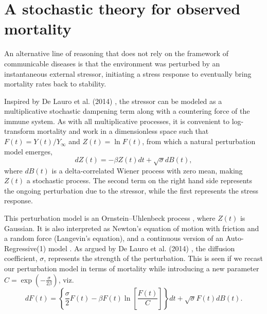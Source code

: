 \documentclass{article}
\begin{document}
\section*{A stochastic theory for observed mortality}
\label{seq:alt}
An alternative line of reasoning that does not rely on the framework of communicable diseases is that the environment was perturbed by an instantaneous external stressor, initiating a stress response to eventually bring mortality rates back to stability.

Inspired by De Lauro et al. (2014) \cite{de2014stochastic}, the stressor can be modeled as a multiplicative stochastic dampening term along with a countering force of the immune system. 
As with all multiplicative processes, it is convenient to log-transform mortality and work in a dimensionless space such that $F(t)=Y(t)/Y_\infty$ and $Z(t)=\ln{F}(t)$, from which a natural perturbation model emerges,
\begin{equation}
\label{eq:microscopic}
dZ(t)= -\beta Z(t) dt + \sqrt{\sigma}dB(t),
\end{equation}
where $dB(t)$ is a delta-correlated Wiener process with zero mean, making $Z(t)$ a stochastic process. The second term on the right hand side represents the ongoing perturbation due to the stressor, while the first represents the stress response.  

This perturbation model is an Ornstein–Uhlenbeck process \cite{risken1996fokker}, where $Z(t)$ is Gaussian. It is also interpreted as Newton's equation of motion with friction and a random force (Langevin's equation), and a continuous version of an Auto-Regressive(1) model \cite{akaike1970statistical}. As argued by De Lauro et al. (2014) \cite{de2014stochastic}, the diffusion coefficient, $\sigma$, represents the strength of the perturbation. This is seen if we recast our perturbation model in terms of mortality while introducing a new parameter $C=\exp{(-\frac{\sigma}{2\beta})}$, viz. 
\begin{equation}
\label{eq:microscopicOriginal}
dF(t) = \left\{\frac{\sigma}{2}F(t) - \beta F(t)\ln\left[\frac{F(t)}{C}\right]\right\}dt + \sqrt{\sigma}F(t)dB(t).
\end{equation}
\end{document}
